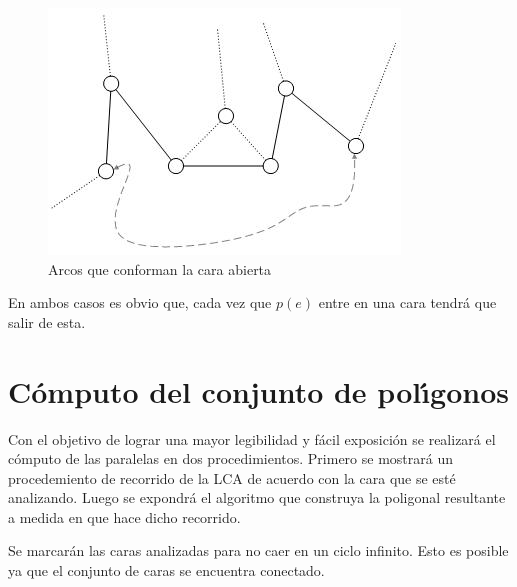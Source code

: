 \documentclass[12pt,english]{report}
\begin{document}
\begin{figure}[htbp]
\begin{center}
\includegraphics{carap.jpg}%
\end{center}
\caption{Arcos que conforman la cara abierta}
\end{figure}

En ambos casos es obvio que, cada vez que $p(e)$ entre en una cara  tendr\'{a} que
salir de esta.

\section{C\'{o}mputo del conjunto de pol\'{\i}gonos }

Con el objetivo de lograr una mayor legibilidad y f\'acil exposici\'on se realizar\'a el c\'omputo de las paralelas en dos procedimientos. Primero se mostrar\'a un procedemiento de recorrido de la LCA de acuerdo con la cara que se est\'e analizando. Luego se expondr\'a el algoritmo que construya la poligonal resultante a medida en que hace dicho recorrido. 

Se marcar\'an las caras analizadas para no caer en un ciclo infinito. Esto es posible ya que el conjunto de caras se encuentra conectado.
\bigskip    
\end{document}
